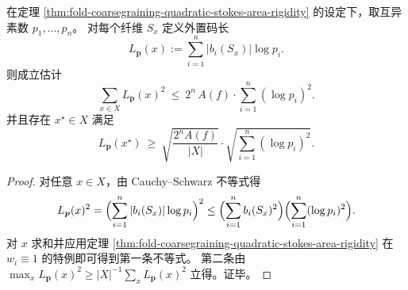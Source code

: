 \begin{corollary}\label{cor:fold-coarsegraining-godel-length-square-area}
在定理 \ref{thm:fold-coarsegraining-quadratic-stokes-area-rigidity} 的设定下，取互异素数 \(p_1,\dots,p_n\)。
对每个纤维 \(S_x\) 定义外置码长
\[
L_{\boldsymbol p}(x):=\sum_{i=1}^n |b_i(S_x)|\log p_i.
\]
则成立估计
\[
\boxed{\;\sum_{x\in X}L_{\boldsymbol p}(x)^2\ \le\ 2^n\,A(f)\cdot\sum_{i=1}^n(\log p_i)^2.\;}
\]
并且存在 \(x^\star\in X\) 满足
\[
\boxed{\;L_{\boldsymbol p}(x^\star)\ \ge\ \sqrt{\frac{2^nA(f)}{|X|}}\cdot\sqrt{\sum_{i=1}^n(\log p_i)^2}.\;}
\]
\end{corollary}
\begin{proof}
对任意 \(x\in X\)，由 Cauchy--Schwarz 不等式得
\[
L_{\boldsymbol p}(x)^2
=\Bigl(\sum_{i=1}^n |b_i(S_x)|\log p_i\Bigr)^2
\le
\Bigl(\sum_{i=1}^n b_i(S_x)^2\Bigr)\Bigl(\sum_{i=1}^n(\log p_i)^2\Bigr).
\]
对 \(x\) 求和并应用定理 \ref{thm:fold-coarsegraining-quadratic-stokes-area-rigidity} 在 \(w_i\equiv 1\) 的特例即可得到第一条不等式。
第二条由 \(\max_x L_{\boldsymbol p}(x)^2\ge |X|^{-1}\sum_x L_{\boldsymbol p}(x)^2\) 立得。证毕。
\end{proof}

